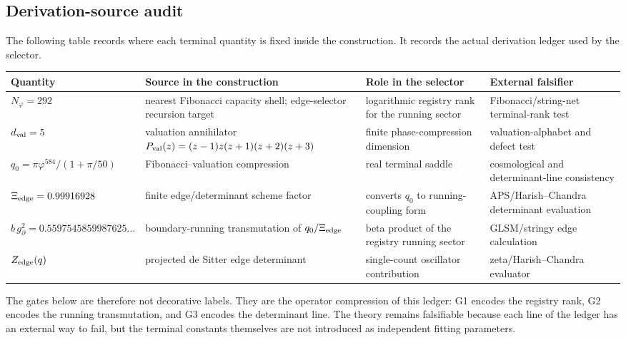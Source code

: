 \documentclass[aps,prd,reprint,nofootinbib,superscriptaddress,floatfix]{revtex4-2}
\numberwithin{equation}{section}
\theoremstyle{definition}
\theoremstyle{plain}
\begin{document}
\subsection{Derivation-source audit}

The following table records where each terminal quantity is fixed inside the
construction.  It records the actual derivation ledger used by the selector.

\begin{widetext}
\begin{center}
\footnotesize
\begin{tabular}{@{}p{}p{}p{}p{}@{}}
\toprule
Quantity & Source in the construction & Role in the selector & External falsifier\\
\midrule
\(N_\varphi=292\) & nearest Fibonacci capacity shell; edge-selector recursion target & logarithmic registry rank for the running sector & Fibonacci/string-net terminal-rank test\\
\(d_{\rm val}=5\) & valuation annihilator \(P_{\rm val}(z)=(z-1)z(z+1)(z+2)(z+3)\) & finite phase-compression dimension & valuation-alphabet and defect test\\
\(q_0=\pi\varphi^{584}/(1+\pi/50)\) & Fibonacci--valuation compression & real terminal saddle & cosmological and determinant-line consistency\\
\(\Xi_{\rm edge}=0.99916928\) & finite edge/determinant scheme factor & converts \(q_0\) to running-coupling form & APS/Harish--Chandra determinant evaluation\\
\(b\,g_\partial^2=0.5597545859987625\ldots\) & boundary-running transmutation of \(q_0/\Xi_{\rm edge}\) & beta product of the registry running sector & GLSM/stringy edge calculation\\
\(Z_{\rm edge}(q)\) & projected de Sitter edge determinant & single-count oscillator contribution & zeta/Harish--Chandra evaluator\\
\bottomrule
\end{tabular}
\end{center}
\end{widetext}

The gates below are therefore not decorative labels.  They are the operator
compression of this ledger: G1 encodes the registry rank, G2 encodes the
running transmutation, and G3 encodes the determinant line.  The theory remains
falsifiable because each line of the ledger has an external way to fail, but
the terminal constants themselves are not introduced as independent fitting
parameters.
\end{document}
